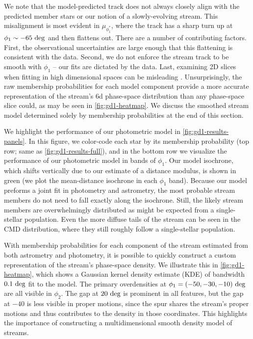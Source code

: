 \documentclass[twocolumn]{aastex631}
\begin{document}
        We note that the model-predicted track does not always closely align
        with the predicted member stars or our notion of a slowly-evolving
        stream. This misalignment is most evident in $\mu_{\phi_1^*}$, where the
        track has a sharp turn up at $\phi_1 \sim -65 \ \rm{deg}$ and then
        flattens out. There are a number of contributing factors. First, the
        observational uncertainties are large enough that this flattening is
        consistent with the data. Second, we do not enforce the stream track to
        be smooth with $\phi_1$ -- our fits are dictated by the data.  Last,
        examining 2D slices when fitting in high dimensional spaces can be
        misleading \citep{Aggarwal+2002}. Unsurprisingly, the raw membership
        probabilities for each model component provide a more accurate
        representation of the stream's 6d phase-space distribution than any
        phase-space slice could, as may be seen in \autoref{fig:gd1-heatmap}. We
        discuss the smoothed stream model determined solely by membership
        probabilities at the end of this section.
        
        We highlight the performance of our photometric model in
        \autoref{fig:gd1-results-panels}. In this figure, we color-code each
        star by its membership probability (top row; same as
        \autoref{fig:gd1-results-full}), and in the bottom row we visualize the
        performance of our photometric model in bands of $\phi_1$. Our model
        isochrone, which shifts vertically due to our estimate of a distance
        modulus, is shown in green (we plot the mean-distance isochrone in each
        $\phi_1$ band). Because our model preforms a joint fit in photometry and
        astrometry, the most probable stream members do not need to fall exactly
        along the isochrone.  Still, the likely stream members are
        overwhelmingly distributed as might be expected from a single-stellar
        population.  Even the more diffuse tails of the stream can be seen in
        the CMD distribution, where they still roughly follow a single-stellar
        population. 
        
        With membership probabilities for each component of the stream estimated
        from both astrometry and photometry, it is possible to quickly construct
        a custom representation of the stream's phase-space density. We
        illustrate this in  \autoref{fig:gd1-heatmap}, which shows a Gaussian
        kernel density estimate (KDE) of bandwidth $0.1 \ \rm{deg}$ fit to the
        model. The primary overdensities at $\phi_1 = (-50, -30, -10) \
        \rm{deg}$ are all visible in $\phi_2$. The gap at $20 \ \rm{deg}$ is
        prominent in all features, but the gap at $-40$ is less visible in
        proper motions, since the spur shares the stream's proper motions and
        thus contributes to the density in those coordinates. This highlights
        the importance of constructing a multidimensional smooth density model
        of streams.
\end{document}
